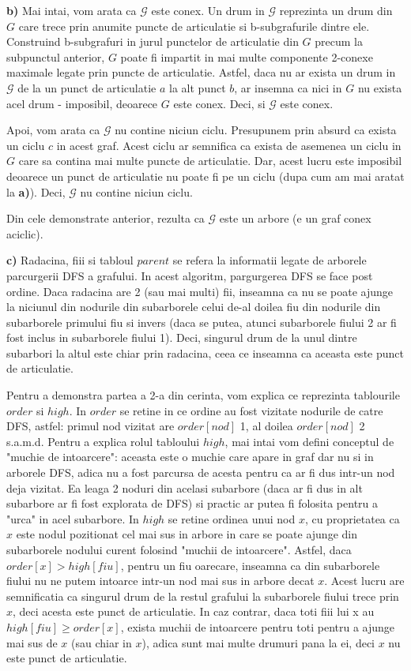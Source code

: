 \documentclass{article}
\begin{document}
{\bf b)} Mai intai, vom arata ca $\mathcal{G}$ este conex. Un drum in $\mathcal{G}$ reprezinta un drum din $G$ care trece prin anumite puncte de articulatie si b-subgrafurile dintre ele. Construind b-subgrafuri in jurul punctelor de articulatie din $G$ precum la subpunctul anterior, $G$ poate fi impartit in mai multe componente 2-conexe maximale legate prin puncte de articulatie. Astfel, daca nu ar exista un drum in $\mathcal{G}$ de la un punct de articulatie $a$ la alt punct $b$, ar insemna ca nici in $G$ nu exista acel drum - imposibil, deoarece $G$ este conex. Deci, si $\mathcal{G}$ este conex.

Apoi, vom arata ca $\mathcal{G}$ nu contine niciun ciclu. Presupunem prin absurd ca exista un ciclu $c$ in acest graf. Acest ciclu ar semnifica ca exista de asemenea un ciclu in $G$ care sa contina mai multe puncte de articulatie. Dar, acest lucru este imposibil deoarece un punct de articulatie nu poate fi pe un ciclu (dupa cum am mai aratat la {\bf a)}). Deci, $\mathcal{G}$ nu contine niciun ciclu.

Din cele demonstrate anterior, rezulta ca $\mathcal{G}$ este un arbore (e un graf conex aciclic).

{\bf c)} Radacina, fiii si tabloul $parent$ se refera la informatii legate de arborele parcurgerii DFS a grafului. In acest algoritm, pargurgerea DFS se face post ordine. Daca radacina are 2 (sau mai multi) fii, inseamna ca nu se poate ajunge la niciunul din nodurile din subarborele celui de-al doilea fiu din nodurile din subarborele primului fiu si invers (daca se putea, atunci subarborele fiului 2 ar fi fost inclus in subarborele fiului 1). Deci, singurul drum de la unul dintre subarbori la altul este chiar prin radacina, ceea ce inseamna ca aceasta este punct de articulatie. 

Pentru a demonstra partea a 2-a din cerinta, vom explica ce reprezinta tablourile $order$ si $high$. In $order$ se retine in ce ordine au fost vizitate nodurile de catre DFS, astfel: primul nod vizitat are $order[nod]$ 1, al doilea $order[nod]$ 2 s.a.m.d. Pentru a explica rolul tabloului $high$, mai intai vom defini conceptul de "muchie de intoarcere": aceasta este o muchie care apare in graf dar nu si in arborele DFS, adica nu a fost parcursa de acesta pentru ca ar fi dus intr-un nod deja vizitat. Ea leaga 2 noduri din acelasi subarbore (daca ar fi dus in alt subarbore ar fi fost explorata de DFS) si practic ar putea fi folosita pentru a "urca" in acel subarbore. In $high$ se retine ordinea unui nod $x$, cu proprietatea ca $x$ este nodul pozitionat cel mai sus in arbore in care se poate ajunge din subarborele nodului curent folosind "muchii de intoarcere". Astfel, daca $order[x] > high[fiu]$, pentru un fiu oarecare, inseamna ca din subarborele fiului nu ne putem intoarce intr-un nod mai sus in arbore decat $x$. Acest lucru are semnificatia ca singurul drum de la restul grafului la subarborele fiului trece prin $x$, deci acesta este punct de articulatie. In caz contrar, daca toti fiii lui x au $high[fiu] \geq order[x]$, exista muchii de intoarcere pentru toti pentru a ajunge mai sus de $x$ (sau chiar in $x$), adica sunt mai multe drumuri pana la ei, deci $x$ nu este punct de articulatie.
\vspace{1cm}
\end{document}
